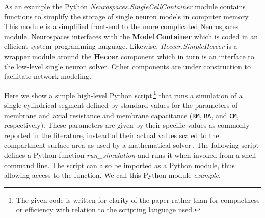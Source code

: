 \documentclass[12pt]{article}
\begin{document}
As an example the Python {\it Neurospaces.SingleCellContainer} module
contains functions to simplify the storage of single neuron models in
computer memory.  This module is a simplified front-end to the more
complicated Neurospaces module.  Neurospaces interfaces
with the {\bf Model\,Container} which is coded in an efficient system
programming language.  Likewise, {\it Heccer.SimpleHeccer} is a
wrapper module around the {\bf Heccer} component which in turn is an
interface to the low-level single neuron solver.  Other components are
under construction to facilitate network modeling.

Here we show a simple high-level Python script\,\footnote{The given code
  is written for clarity of the paper rather than for compactness or
  efficiency with relation to the scripting language used.} that runs
a simulation of a single cylindrical segment defined by standard
values for the parameters of membrane and axial resistance and
membrane capacitance ({\tt RM}, {\tt RA},
and {\tt CM}, respectively).  These parameters are given by their
specific values as commonly reported in the literature, instead of
their actual values scaled to the compartment surface area as used by
a mathematical solver\,\cite{cornelis04:_neuros_param_handl}. The following
script defines a Python function {\it run\_simulation} and runs it
when invoked from a shell command line.  The script can also be
imported as a Python module, thus allowing access to the function.  We
call this Python module {\it example}.
\end{document}
